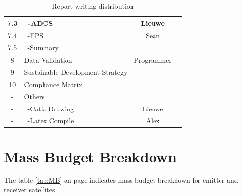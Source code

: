 \begin{table}[ht!]
{\begin{tabular}{|c|l|c|c|}
 7.3     & \ -ADCS                              & Lieuwe &\\\hline
 7.4     & \ -EPS                               & Sean &\\\hline
 7.5     & \ -Summary                           &\\\hline\hline
 8       & Data Validation                      & Programmer &\\\hline
 9       & Sustainable Development Strategy     &\\\hline
 10      & Compliance Matrix                    &\\\hline\hline
 -       & Others                               &\\\hline
 -       & \ -Catia Drawing                     & Lieuwe &\\\hline
 -       & \ -Latex Compile                     & Alex &\\\hline

\end{tabular}
}
\caption{Report writing distribution}
\label{tab:RWD}
\end{table}

\section{Mass Budget Breakdown}
\label{DDMBB}
The table \ref{tab:MB} on page \pageref{tab:MB} indicates mass budget breakdown for emitter and receiver satellites.

